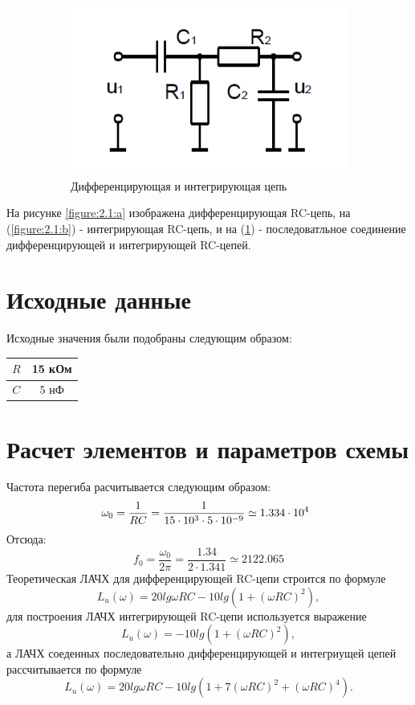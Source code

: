\begin{figure}[h]
\begin{subfigure}[b]{0.3\textwidth}
\includegraphics[scale=0.4]{v_scheme.png}
\caption{Дифференцирующая и интегрирующая цепь}\label{figure:2.1:c}
\end{subfigure}
\caption{}\label{figure:2.1}
\end{figure}
На рисунке \ref{figure:2.1:a} изображена дифференцирующая RC-цепь, на (\ref{figure:2.1:b}) - интегрирующая RC-цепь, и на  (\ref{figure:2.1:c}) - последоватльное соединение дифференцирующей и интегрирующей RC-­цепей.


\section{Исходные данные}
Исходные значения были подобраны следующим образом:
\begin{center}
\begin{tabular}{|c|c|}
\hline 
$R$ & 15 кОм \\ 
\hline 
$C$ & 5 нФ \\ 
\hline 
\end{tabular}  
\end{center}


\section{Расчет элементов и параметров схемы}
Частота перегиба расчитывается следующим образом:
\begin{equation}
\omega_0 = \frac{1}{RC} = \frac{1}{15 \cdot 10^3 \cdot 5 \cdot 10^{-9}} \simeq 1.334 \cdot 10^4 \hspace*{2mm}
\end{equation}
Отсюда: 
\begin{equation}
f_0 = \frac{\omega_0}{2 \pi} = \frac{1.34}{2\cdot1.341} \simeq 2122.065   
\end{equation}
Теоретическая ЛАЧХ для дифференцирующей RC-цепи строится по
формуле
\begin{equation}
L_u(\omega) = 20lg \omega RC - 10lg(1+(\omega RC)^2),
\end{equation}
для построения ЛАЧХ интегрирующей RC-цепи используется выражение
\begin{equation}
L_u(\omega) = - 10lg(1+(\omega RC)^2),
\end{equation}
а ЛАЧХ соеденных последовательно дифференцирующей и интегриущей цепей рассчитывается по формуле
\begin{equation}
L_u(\omega) = 20lg \omega RC - 10lg(1+7(\omega RC)^2 + (\omega RC)^4).
\end{equation}



